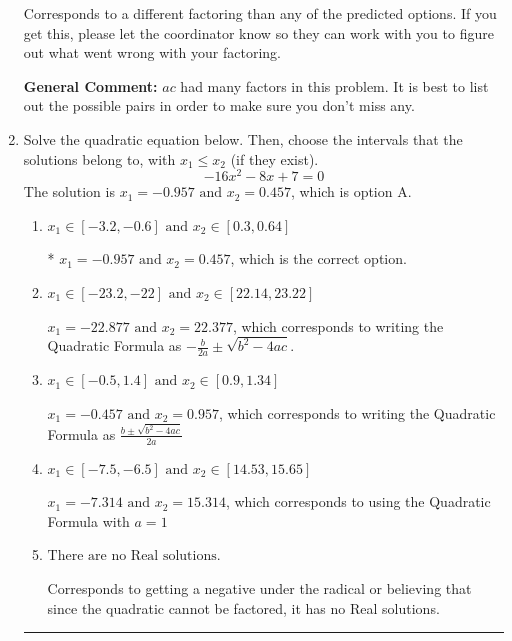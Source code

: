 \documentclass{extbook}[14pt]
\newcommand{\litem}[1]{\item #1

\rule{\textwidth}{0.4pt}}
\begin{document}
\begin{enumerate}
{\begin{enumerate}[label=\Alph*.]
 Corresponds to a different factoring than any of the predicted options. If you get this, please let the coordinator know so they can work with you to figure out what went wrong with your factoring.
\end{enumerate}

\textbf{General Comment:} $ac$ had many factors in this problem. It is best to list out the possible pairs in order to make sure you don't miss any.
}
\litem{
Solve the quadratic equation below. Then, choose the intervals that the solutions belong to, with $x_1 \leq x_2$ (if they exist).
\[ -16x^{2} -8 x + 7 = 0 \]The solution is \( x_1 = -0.957 \text{ and } x_2 = 0.457 \), which is option A.\begin{enumerate}[label=\Alph*.]
\item \( x_1 \in [-3.2, -0.6] \text{ and } x_2 \in [0.3, 0.64] \)

* $x_1 = -0.957 \text{ and } x_2 = 0.457$, which is the correct option.
\item \( x_1 \in [-23.2, -22] \text{ and } x_2 \in [22.14, 23.22] \)

 $x_1 = -22.877 \text{ and } x_2 = 22.377$, which corresponds to writing the Quadratic Formula as $-\frac{b}{2a} \pm \sqrt{b^2 - 4ac}$.
\item \( x_1 \in [-0.5, 1.4] \text{ and } x_2 \in [0.9, 1.34] \)

 $x_1 = -0.457 \text{ and } x_2 = 0.957$, which corresponds to writing the Quadratic Formula as $\frac{b \pm \sqrt{b^2 - 4ac}}{2a}$
\item \( x_1 \in [-7.5, -6.5] \text{ and } x_2 \in [14.53, 15.65] \)

 $x_1 = -7.314 \text{ and } x_2 = 15.314$, which corresponds to using the Quadratic Formula with $a=1$
\item \( \text{There are no Real solutions.} \)

Corresponds to getting a negative under the radical or believing that since the quadratic cannot be factored, it has no Real solutions.
\end{enumerate}

}
\end{enumerate}
\end{document}
